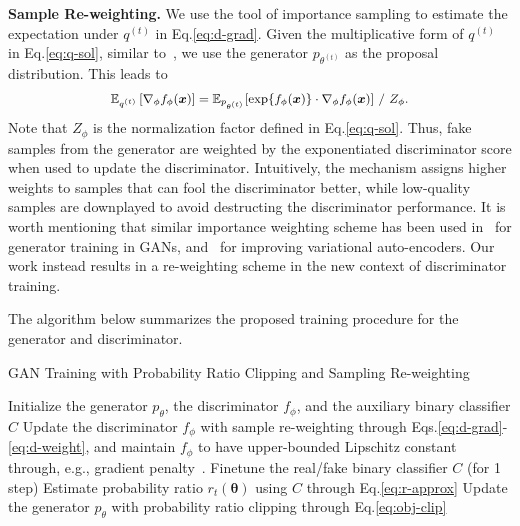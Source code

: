 \documentclass{article}
\newcommand{\0}{\bm{0}}
\newcommand{\E}{\mathbb{E}}
\newcommand{\x}{\bm{x}}
\begin{document}
\textbf{Sample Re-weighting.}  
We use the tool of importance sampling to estimate the expectation under $q^{(t)}$ in Eq.\eqref{eq:d-grad}. Given the multiplicative form of $q^{(t)}$ in Eq.\eqref{eq:q-sol}, similar to~\cite{abdolmaleki2018maximum,hu2018deep,deng2020residual}, we use the generator $p_{\theta^{(t)}}$ as the proposal distribution. This leads to 
\begin{equation}
\small
\begin{split}
\E_{q^{(t)}}\left[ \nabla_\phi f_\phi(\x) \right] = \E_{p_{\theta^{(t)}}}[ \exp\{f_\phi(\x)\} \cdot \nabla_\phi f_\phi(\x) ] \ /\  Z_\phi.
\end{split}
\label{eq:d-weight}
\end{equation}
Note that $Z_\phi$ is the normalization factor defined in Eq.\eqref{eq:q-sol}. Thus, fake samples from the generator are weighted by the exponentiated discriminator score when used to update the discriminator. Intuitively, the mechanism assigns higher weights to samples that can fool the discriminator better, while low-quality samples are downplayed to avoid destructing the discriminator performance. It is worth mentioning that similar importance weighting scheme has been used in~\cite{hu2017unifying,MLGAN} for generator training in GANs, and~\cite{burda2015importance} for improving variational auto-encoders. Our work instead results in a re-weighting scheme in the new context of discriminator training.

The algorithm below summarizes the proposed training procedure for the generator and discriminator.

\begin{algorithm}[!h]
\centering
\caption{\small GAN Training with Probability Ratio Clipping and Sampling Re-weighting}
\label{alg:opt}
\begin{algorithmic}[1]
\STATE Initialize the generator $p_\theta$, the discriminator $f_\phi$, and the auxiliary binary classifier $C$
	    \STATE Update the discriminator $f_\phi$ with sample re-weighting through Eqs.\eqref{eq:d-grad}-\eqref{eq:d-weight}, and maintain $f_\phi$ to have upper-bounded Lipschitz constant through, e.g., gradient penalty~\cite{wgangp}.
	\ENDFOR
	    \STATE Finetune the real/fake binary classifier $C$ (for 1 step)
	    \STATE Estimate probability ratio $r_t(\bm{\theta})$ using $C$ through Eq.\eqref{eq:r-approx}
	    \STATE Update the generator $p_\theta$ with probability ratio clipping through Eq.\eqref{eq:obj-clip}
    \ENDFOR
\ENDFOR
\end{algorithmic}
\end{algorithm}
\end{document}
